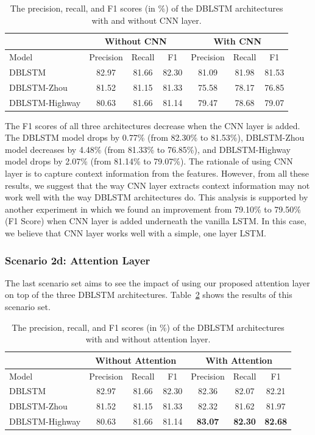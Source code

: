 \begin{table}
	\caption{The precision, recall, and F1 scores (in \%) of the DBLSTM architectures with and without CNN layer.}
	\centering
	\label{tab:modelselection3}
	\begin{tabular}{|l|ccc|ccc|}
		\hline
		& \multicolumn{3}{c}{ Without CNN } & \multicolumn{3}{c}{ With CNN } \\
		\hline
		Model& Precision & Recall & F1 & Precision & Recall & F1 \\
		\hline \hline
		DBLSTM & 82.97 & 81.66 & 82.30 & 81.09 & 81.98 & 81.53 \\
		DBLSTM-Zhou & 81.52 & 81.15 & 81.33 & 75.58 & 78.17 & 76.85 \\
		DBLSTM-Highway & 80.63 & 81.66 & 81.14 & 79.47& 78.68& 79.07 \\
		\hline
	\end{tabular}

\end{table}

The F1 scores of all three architectures decrease when the CNN layer is added. The DBLSTM model drops by 0.77\% (from 82.30\% to 81.53\%), DBLSTM-Zhou model decreases by 4.48\% (from 81.33\% to 76.85\%), and DBLSTM-Highway model drops by 2.07\% (from 81.14\% to 79.07\%). The rationale of using CNN layer is to capture context information from the features. However, from all these results, we suggest that the way CNN layer extracts context information may not work well with the way DBLSTM architectures do. This analysis is supported by another experiment in which we found an improvement from 79.10\% to 79.50\% (F1 Score) when CNN layer is added underneath the vanilla LSTM. In this case, we believe that CNN layer works well with a simple, one layer LSTM.

\subsubsection{Scenario 2d: Attention Layer}
The last scenario set aims to see the impact of using our proposed attention layer on top of the three DBLSTM architectures. Table~\ref{tab:modelselection4} shows the results of this scenario set.

\begin{table}
	\caption{The precision, recall, and F1 scores (in \%) of the DBLSTM architectures with and without attention layer.}
	\centering
	\label{tab:modelselection4}
	\begin{tabular}{|l|ccc|ccc|}
		\hline
		& \multicolumn{3}{c}{ Without Attention } & \multicolumn{3}{c}{ With Attention } \\
		\hline
		Model & Precision & Recall & F1 & Precision & Recall & F1 \\
		\hline \hline
		DBLSTM & 82.97 & 81.66 & 82.30 & 82.36 & 82.07 & 82.21 \\
		DBLSTM-Zhou & 81.52 & 81.15 & 81.33 & 82.32 & 81.62 & 81.97 \\
		DBLSTM-Highway & 80.63 & 81.66 & 81.14 & \textbf{83.07} & \textbf{82.30} & \textbf{82.68} \\
		\hline
	\end{tabular}

\end{table}

